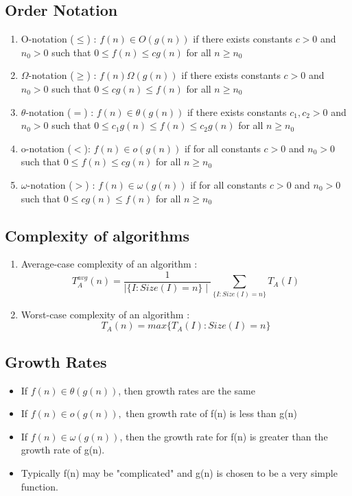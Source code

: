\documentclass{article}
\begin{document}
\subsection{Order Notation}
\begin{enumerate}
\item O-notation (\(\leq\)) : \(f(n) \in O(g(n))\) if there exists constants \(c > 0\) and \(n_0 > 0\) such that \(0 \leq f(n) \leq c g(n)\) for all \(n \geq n_0\)
\item \(\Omega\)-notation (\(\geq\)) : \(f(n) \Omega(g(n))\) if there exists constants \(c > 0\) and \(n_0 > 0\) such that \(0 \leq cg(n) \leq f(n)\) for all \(n \geq n_0\)
\item \(\theta\)-notation (\(=\)) : \(f(n) \in \theta(g(n))\) if there exists constants \(c_1, c_2 > 0\) and \(n_0 > 0\) such that \(0 \leq c_1 g(n) \leq f(n) \leq c_2 g(n)\) for all \(n \geq n_0\)
\item o-notation  (\(<\)):  \(f(n) \in o(g(n))\) if for all  constants \(c > 0\) and \(n_0 > 0\) such that \(0 \leq f(n) \leq cg(n)\) for all \(n \geq n_0\)
\item \(\omega\)-notation (\(>\)) :  \(f(n) \in \omega(g(n))\) if for all  constants \(c > 0\) and \(n_0 > 0\) such that \(0 \leq cg(n) \leq f(n)\) for all \(n \geq n_0\)
\end{enumerate}

\subsection{Complexity of algorithms}
\begin{enumerate}
\item Average-case complexity of an algorithm : 
\[T^{avg}_A(n)= \frac{1}{\mid \{I : Size(I) = n\}\mid} \sum_{\{I:Size(I)=n\}}T_A(I)\]
\item Worst-case complexity of an algorithm : 
\[T_A(n) = max\{T_A(I) : Size (I) = n\} \]
\end{enumerate}

\subsection{Growth Rates}
\begin{itemize}
\item If \(f(n) \in \theta(g(n))\), then growth rates are the same 
\item If \(f(n) \in o(g(n)),\) then growth rate of f(n) is less than g(n)
\item If \(f(n) \in \omega(g(n))\), then the growth rate for f(n) is greater than the growth rate of g(n).
\item Typically f(n) may be "complicated" and g(n) is chosen to be a very simple function.
\end{itemize}
\end{document}
